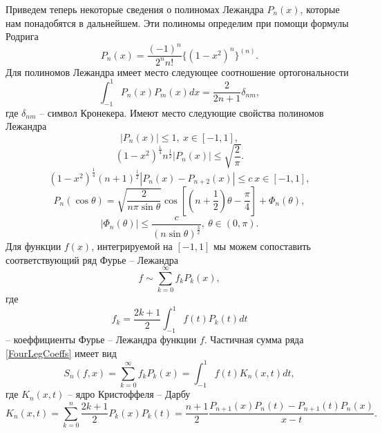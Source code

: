Приведем теперь некоторые сведения о полиномах Лежандра $P_n(x)$, которые нам понадобятся в дальнейшем. Эти полиномы определим при помощи формулы Родрига
\begin{equation}\label{RodrigueFormula}
  P_n(x)=\frac{(-1)^n}{2^nn!}\{(1-x^2)^n\}^{(n)}.
\end{equation}
Для полиномов Лежандра имеет место следующее соотношение ортогональности
\begin{equation}\label{LegOrthRel}
  \int_{-1}^1P_n(x)P_m(x)dx=\frac{2}{2n+1}\delta_{nm},
\end{equation}
где $\delta_{nm}$ -- символ Кронекера. Имеют место следующие свойства полиномов Лежандра
\begin{equation}\label{Leg-Prop1}
  |P_n(x)|\le1,\ x\in[-1,1],
\end{equation}
\begin{equation}\label{Leg-Prop2}
  (1-x^2)^{\frac14}n^{\frac12}|P_n(x)|\le\sqrt{\frac2\pi}.
\end{equation}
\begin{equation}\label{Leg-Prop3}
  (1-x^2)^{\frac14}(n+1)^{\frac12}|P_n(x)-P_{n+2}(x)|\le c\ x\in[-1,1],
\end{equation}
\begin{equation}\label{Leg-Prop4}
  P_n(\cos\theta)=\sqrt{\frac2{n\pi\sin\theta}}\cos\left[\left(n+\frac12\right)\theta-\frac\pi4\right]+\Phi_n(\theta),
\end{equation}
\begin{equation}\label{Leg-Prop5}
  |\Phi_n(\theta)|\le\frac c{(n\sin\theta)^\frac32},\ \theta\in(0,\pi).
\end{equation}
Для функции $f(x)$, интегрируемой на $[-1,1]$ мы можем сопоставить соответствующий ряд Фурье -- Лежандра
\begin{equation}\label{FourLegSeries}
  f\sim\sum_{k=0}^\infty f_kP_k(x),
\end{equation}
где
\begin{equation}\label{FourLegCoeffs}
  f_k=\frac{2k+1}{2}\int_{-1}^1f(t)P_k(t)dt
\end{equation}
-- коеффициенты Фурье -- Лежандра функции $f$. Частичная сумма ряда \eqref{FourLegCoeffs} имеет вид
\begin{equation}\label{FourLegPartialSum}
  S_n(f,x)=\sum_{k=0}^\infty f_kP_k(x)=\int_{-1}^{1}f(t)K_n(x,t)dt,
\end{equation}
где $K_n(x,t)$ -- ядро Кристоффеля -- Дарбу
\begin{equation}\label{KrisDarbouxFormula}
 K_n(x,t)=\sum_{k=0}^n\frac{2k+1}{2}P_k(x)P_k(t)=\frac{n+1}2\frac{P_{n+1}(x)P_n(t)-P_{n+1}(t)P_n(x)}{x-t}.
\end{equation}
 
